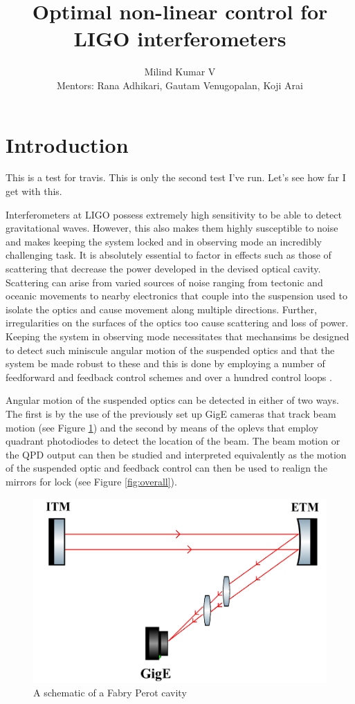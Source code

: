 \documentclass[colorlinks=true,pdfstartview=FitV,linkcolor=blue,
            citecolor=red,urlcolor=magenta]{ligodoc}
\title{Optimal non-linear control for LIGO interferometers}
\author{Milind Kumar V \\ Mentors: Rana Adhikari, Gautam Venugopalan, Koji Arai}
\begin{document}
\section{Introduction}\label{introduction}

This is a test for travis. This is only the second test I've run. Let's see how far I get with this.

Interferometers at LIGO possess extremely high sensitivity to be able to detect gravitational waves. However, this also makes them highly susceptible to noise and makes keeping the system locked and in observing mode an incredibly challenging task. It is absolutely essential to factor in effects such as those of scattering that decrease the power developed in the devised optical cavity. Scattering can arise from varied sources of noise ranging from tectonic and oceanic movements to nearby electronics that couple into the suspension used to isolate the optics and cause movement along multiple directions. Further, irregularities on the surfaces of the optics too cause scattering and loss of power. Keeping the system in observing mode necessitates that mechansims be designed to detect such miniscule angular motion of the suspended optics and that the system be made robust to these and this is done by employing a number of feedforward and feedback control schemes and over a hundred control loops \cite{adhikari2004sensitivity}.


Angular motion of the suspended optics can be detected in either of two ways. The first is by the use of the previously set up GigE cameras \cite{gige} that track beam motion (see Figure \ref{fig:gige}) and the second by means of the oplevs that employ quadrant photodiodes to detect the location of the beam. The beam motion or the QPD output can then be studied and interpreted equivalently as the motion of the suspended optic and feedback control can then be used to realign the mirrors for lock (see Figure \ref{fig:overall}).  

\begin{figure}[htbp]
\begin{center}
\includegraphics[width=.8\linewidth]{gige.png}
\caption{A schematic of a Fabry Perot cavity}
\label{fig:gige}
\end{center}
\end{figure} 
\end{document}
